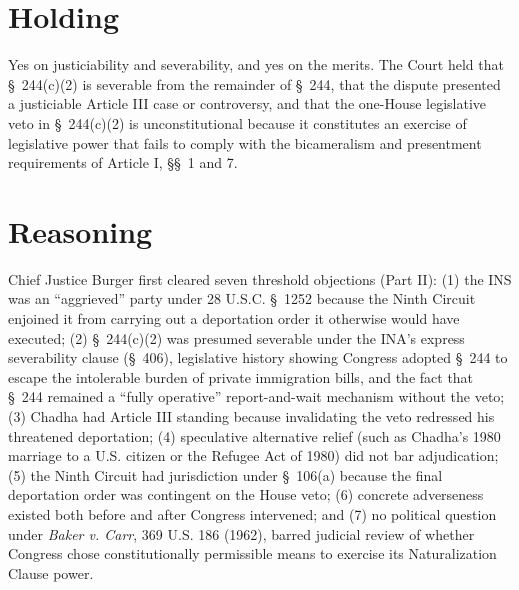\documentclass[12pt]{article}
\begin{document}
\section{Holding}
Yes on justiciability and severability, and yes on the merits. The Court held that \S~244(c)(2) is severable from the remainder of \S~244, that the dispute presented a justiciable Article III case or controversy, and that the one-House legislative veto in \S~244(c)(2) is unconstitutional because it constitutes an exercise of legislative power that fails to comply with the bicameralism and presentment requirements of Article I, \S\S~1 and 7.

\section{Reasoning}
Chief Justice Burger first cleared seven threshold objections (Part II): (1) the INS was an ``aggrieved'' party under 28 U.S.C. \S~1252 because the Ninth Circuit enjoined it from carrying out a deportation order it otherwise would have executed; (2) \S~244(c)(2) was presumed severable under the INA's express severability clause (\S~406), legislative history showing Congress adopted \S~244 to escape the intolerable burden of private immigration bills, and the fact that \S~244 remained a ``fully operative'' report-and-wait mechanism without the veto; (3) Chadha had Article III standing because invalidating the veto redressed his threatened deportation; (4) speculative alternative relief (such as Chadha's 1980 marriage to a U.S. citizen or the Refugee Act of 1980) did not bar adjudication; (5) the Ninth Circuit had jurisdiction under \S~106(a) because the final deportation order was contingent on the House veto; (6) concrete adverseness existed both before and after Congress intervened; and (7) no political question under \textit{Baker v. Carr}, 369 U.S. 186 (1962), barred judicial review of whether Congress chose constitutionally permissible means to exercise its Naturalization Clause power.
\end{document}
